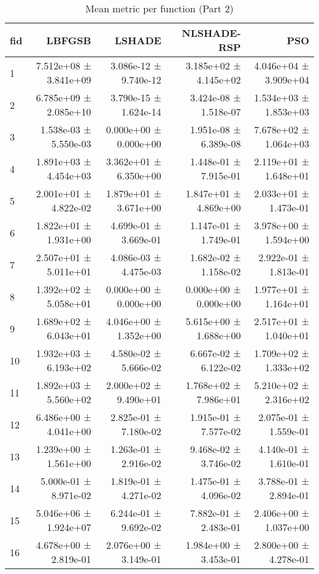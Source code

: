 \begin{table}[htbp]
    \centering
    \caption{Mean metric per function (Part 2)}
    \label{tab:mean_all_part2}
    \begin{tabular}{lrrrr}
    \toprule
    fid & LBFGSB & LSHADE & NLSHADE-RSP & PSO \\
    \midrule
    1 & 7.512e+08 ± 3.841e+09 & 3.086e-12 ± 9.740e-12 & 3.185e+02 ± 4.145e+02 & 4.046e+04 ± 3.909e+04 \\
2 & 6.785e+09 ± 2.085e+10 & 3.790e-15 ± 1.624e-14 & 3.424e-08 ± 1.518e-07 & 1.534e+03 ± 1.853e+03 \\
3 & 1.538e-03 ± 5.550e-03 & 0.000e+00 ± 0.000e+00 & 1.951e-08 ± 6.389e-08 & 7.678e+02 ± 1.064e+03 \\
4 & 1.891e+03 ± 4.454e+03 & 3.362e+01 ± 6.350e+00 & 1.448e-01 ± 7.915e-01 & 2.119e+01 ± 1.648e+01 \\
5 & 2.001e+01 ± 4.822e-02 & 1.879e+01 ± 3.671e+00 & 1.847e+01 ± 4.869e+00 & 2.033e+01 ± 1.473e-01 \\
6 & 1.822e+01 ± 1.931e+00 & 4.699e-01 ± 3.669e-01 & 1.147e-01 ± 1.749e-01 & 3.978e+00 ± 1.594e+00 \\
7 & 2.507e+01 ± 5.011e+01 & 4.086e-03 ± 4.475e-03 & 1.682e-02 ± 1.158e-02 & 2.922e-01 ± 1.813e-01 \\
8 & 1.392e+02 ± 5.058e+01 & 0.000e+00 ± 0.000e+00 & 0.000e+00 ± 0.000e+00 & 1.977e+01 ± 1.164e+01 \\
9 & 1.689e+02 ± 6.043e+01 & 4.046e+00 ± 1.352e+00 & 5.615e+00 ± 1.688e+00 & 2.517e+01 ± 1.040e+01 \\
10 & 1.932e+03 ± 6.193e+02 & 4.580e-02 ± 5.666e-02 & 6.667e-02 ± 6.122e-02 & 1.709e+02 ± 1.333e+02 \\
11 & 1.892e+03 ± 5.560e+02 & 2.000e+02 ± 9.490e+01 & 1.768e+02 ± 7.986e+01 & 5.210e+02 ± 2.316e+02 \\
12 & 6.486e+00 ± 4.041e+00 & 2.825e-01 ± 7.180e-02 & 1.915e-01 ± 7.577e-02 & 2.075e-01 ± 1.559e-01 \\
13 & 1.239e+00 ± 1.561e+00 & 1.263e-01 ± 2.916e-02 & 9.468e-02 ± 3.746e-02 & 4.140e-01 ± 1.610e-01 \\
14 & 5.000e-01 ± 8.971e-02 & 1.819e-01 ± 4.271e-02 & 1.475e-01 ± 4.096e-02 & 3.788e-01 ± 2.894e-01 \\
15 & 5.046e+06 ± 1.924e+07 & 6.244e-01 ± 9.692e-02 & 7.882e-01 ± 2.483e-01 & 2.406e+00 ± 1.037e+00 \\
16 & 4.678e+00 ± 2.819e-01 & 2.076e+00 ± 3.149e-01 & 1.984e+00 ± 3.453e-01 & 2.800e+00 ± 4.278e-01 \\

\end{tabular}
\end{table}
